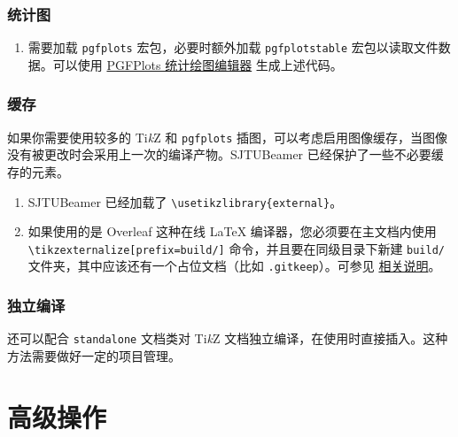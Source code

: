 \documentclass[
    UTF8,
    heading=true,
    12pt,
    a4paper
]{ctexrep}
\newenvironment{commentlist}
{\begin{enumerate}\small}
{\end{enumerate}}
\newcommand{\cls}[1]{\texttt{#1}}
\newcommand{\pkg}[1]{\texttt{#1}}
\def\themename{\textsf{SJTUBeamer}}
\begin{document}
\section{统计图}


\begin{commentlist}
  \item 需要加载 \pkg{pgfplots} 宏包，必要时额外加载
  \pkg{pgfplotstable} 宏包以读取文件数据。可以使用
  \href{https://logcreative.github.io/PGFPlotsEdt/}{PGFPlots 统计绘图编辑器}
  生成上述代码。
\end{commentlist}

\section{缓存}

如果你需要使用较多的 Ti\emph{k}Z 和 \pkg{pgfplots}
插图，可以考虑启用图像缓存，当图像没有被更改时会采用上一次的编译产物。\themename{}
已经保护了一些不必要缓存的元素。


\begin{commentlist}
  \item \themename{} 已经加载了
  \verb"\usetikzlibrary{external}"。
  \item[\faExclamationTriangle] 如果使用的是 Overleaf
  这种在线 \LaTeX{} 编译器，您必须要在主文档内使用
  \verb"\tikzexternalize[prefix=build/]" 命令，并且要在同级目录下新建
  \verb"build/" 文件夹，其中应该还有一个占位文档（比如
  \verb".gitkeep"）。可参见
  \href{https://www.overleaf.com/learn/latex/Questions/I_have_a_lot_of_tikz%2C_matlab2tikz_or_pgfplots_figures%2C_so_I%27m_getting_a_compilation_timeout._Can_I_externalise_my_figures%3F}{相关说明}。
\end{commentlist}

\section{独立编译}

还可以配合 \cls{standalone} 文档类对 Ti\emph{k}Z
文档独立编译，在使用时直接插入。这种方法需要做好一定的项目管理。


\part{高级操作}
\end{document}
